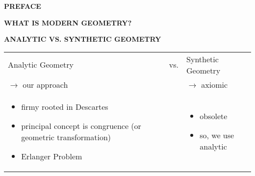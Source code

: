 \documentclass{book}
\begin{document}
\begin{center}
{{\bf{}\Huge PREFACE}}
\end{center}

\vspace{30pt}

{\bf{}\Large WHAT IS MODERN GEOMETRY?}

\vspace{10pt}

\begin{center}
\end{center}

\vspace{20pt}

{\bf{}\Large ANALYTIC VS. SYNTHETIC GEOMETRY}

\vspace{10pt}

\begin{center}
\begin{tabular}{p{2in}cp{2in}}
Analytic Geometry & vs. & Synthetic Geometry\\
$\rightarrow$ our approach &  & $\rightarrow$ axiomic\\
\begin{itemize}
\item firmy rooted in Descartes
\item principal concept is congruence (or geometric transformation)
\item Erlanger Problem
\end{itemize}
&&
\begin{itemize}
\item obsolete
\item so, we use analytic
\end{itemize}
\end{tabular}
\end{center}
\end{document}
